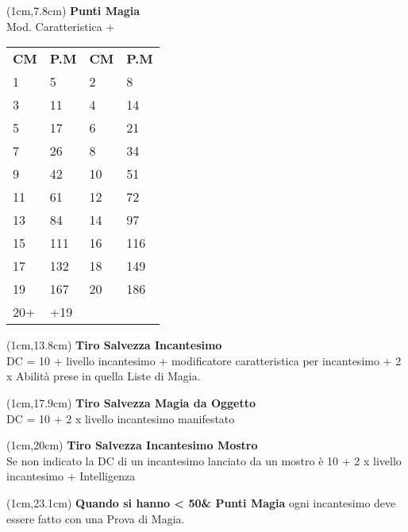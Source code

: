 \documentclass[a4paper,12 pt,openany]{book}
\begin{document}
{\footnotesize
\begin{textblock*}{5cm}(1cm,7.8cm) %
\textbf{Punti Magia}\\
Mod. Caratteristica + \\
\begin{tabular}{ll|ll}
\textbf{CM} & \textbf{P.M}&	\textbf{CM} & \textbf{P.M}\\
1 &5 &2&8 \\
3&11&4&14\\
5&17&6&21\\
7&26&8&34\\
9&42&10&51\\
11&61&12&72\\
13&84&14&97\\
15&111&16&116\\
17&132&18&149\\
19&167&20&186\\
20+&+19&&\\
	\hline
\end{tabular}
\end{textblock*} }

\begin{textblock*}{5cm}(1cm,13.8cm) %
\textbf{Tiro Salvezza Incantesimo}\\
DC = 10 + livello incantesimo + modificatore caratteristica per incantesimo + 2 x Abilità prese in quella Liste di Magia.
\end{textblock*}

\begin{textblock*}{5cm}(1cm,17.9cm) %
\textbf{Tiro Salvezza Magia da Oggetto}\\
DC = 10 + 2 x livello incantesimo manifestato
\end{textblock*}

\begin{textblock*}{5cm}(1cm,20cm) %
	\textbf{Tiro Salvezza Incantesimo Mostro}\\
Se non indicato la DC di un incantesimo lanciato da un mostro è 10 + 2 x livello incantesimo + Intelligenza
\end{textblock*}

\begin{textblock*}{5cm}(1cm,23.1cm) %
{\small
\textbf{Quando si hanno < 50\& Punti Magia} ogni incantesimo deve essere fatto con una Prova di Magia.}
\end{textblock*}
\end{document}
